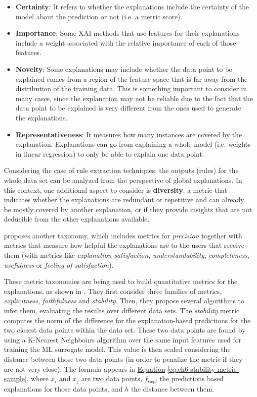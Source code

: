 \begin{itemize}
    \item \textbf{Certainty}: It refers to whether the explanations include the certainty of the model about the prediction or not (i.e. a metric score).
    \item \textbf{Importance}: Some XAI methods that use features for their explanations include a weight associated with the relative importance of each of those features. 
    \item \textbf{Novelty}: Some explanations may include whether the data point to be explained comes from a region of the feature space that is far away from the distribution of the training data. This is something important to consider in many cases, since the explanation may not be reliable due to the fact that the data point to be explained is very different from the ones used to generate the explanations.
    \item \textbf{Representativeness}: It measures how many instances are covered by the explanation. Explanations can go from explaining a whole model (i.e. weights in linear regression) to only be able to explain one data point. 
\end{itemize}

Considering the case of rule extraction techniques, the outputs (rules) for the whole data set can be analyzed from the perspective of global explanations. In this context, one additional aspect to consider is \textbf{diversity}, a metric that indicates whether the explanations are redundant or repetitive and can already be mostly covered by another explanation, or if they provide insights that are not deducible from the other explanations available. 

\parencite{hoffman2018metrics} proposes another taxonomy, which includes metrics for \textit{precision} together with metrics that measure how helpful the explanations are to the users that receive them (with metrics like \textit{explanation satisfaction}, \textit{understandability}, \textit{completeness}, \textit{usefulness} or \textit{feeling of satisfaction}). 

These metric taxonomies are being used to build quantitative metrics for the explanations, as shown in \parencite{melis2018towards}. They first consider three families of metrics, \textit{explicitness}, \textit{faithfulness} and \textit{stability}. Then, they propose several algorithms to infer them, evaluating the results over different data sets. The \textit{stability}
metric computes the norm of the difference for the explanation-based predictions for the two closest data points within the data set. These two data points are found by using a K-Nearest Neighbours algorithm over the same input features used for training the ML surrogate model. This value is then scaled considering the distance between those two data points (in order to penalize the metric if they are not very close). The formula appears in \hyperref[eq:ch6-stability-metric-sample]{Equation} \ref{eq:ch6-stability-metric-sample}, where $x_i$ and $x_j$ are two data points, $f_{expl}$ the predictions based explanations for those data points, and $h$ the distance between them.

